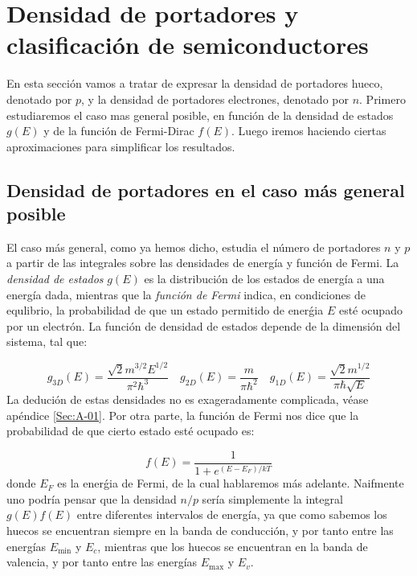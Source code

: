 
\section{Densidad de portadores y clasificación de semiconductores}

En esta sección vamos a tratar de expresar la densidad de portadores hueco, denotado por $p$, y la densidad de portadores electrones, denotado por $n$. Primero estudiaremos el caso mas general posible, en función de la densidad de estados $g(E)$ y de la función de Fermi-Dirac $f(E)$. Luego iremos haciendo ciertas aproximaciones para simplificar los resultados.

\subsection{Densidad de portadores en el caso más general posible}

El caso más general, como ya hemos dicho, estudia el número de portadores $n$ y $p$ a partir de las integrales sobre las densidades de energía y función de Fermi. La \textit{densidad de estados} $g(E)$ es la distribución de los estados de energía a una energía dada, mientras que la \textit{función de Fermi} indica, en condiciones de equlibrio, la probabilidad de que un estado permitido de enerǵia $E$ esté ocupado por un electrón. La función de densidad de estados depende de la dimensión del sistema, tal que:

\begin{equation}
	g_{3D} (E) = \frac{\sqrt{2}m^{3/2}E^{1/2}}{\pi^2 \hbar^3} \quad g_{2D} (E) = \frac{m}{\pi \hbar^2} \quad g_{1D} (E) = \frac{\sqrt{2}m^{1/2}}{\pi \hbar \sqrt{E}}
\end{equation}
La dedución de estas densidades no es exageradamente complicada, véase apéndice \ref{Sec:A-01}. Por otra parte, la función de Fermi nos dice que la probabilidad de que cierto estado esté ocupado es: 


\begin{equation}
	f(E) = \frac{1}{1+e^{(E-E_F)/kT}}
\end{equation}
donde $E_F$ es la enerǵia de Fermi, de la cual hablaremos más adelante. Naifmente uno podría pensar que la densidad $n/p$ sería simplemente la integral $g(E)f(E)$ entre diferentes intervalos de energía, ya que como sabemos los huecos se encuentran siempre en la banda de conducción, y por tanto entre las energías $E_{\min}$ y $E_c$, mientras que los huecos se encuentran en la banda de valencia, y por tanto entre las energías $E_{\max}$ y $E_v$.

